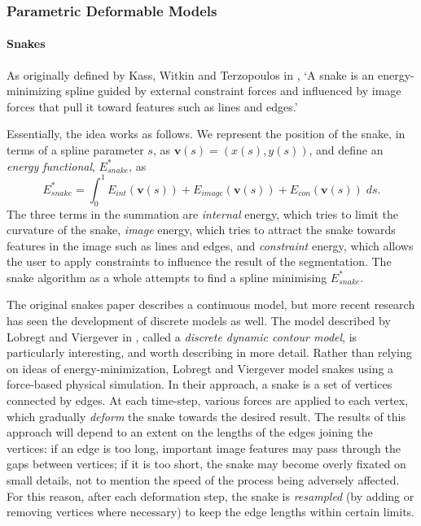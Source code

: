 \subsubsection{Parametric Deformable Models}

\paragraph{Snakes}

As originally defined by Kass, Witkin and Terzopoulos in \cite{kass88}, `A snake is an energy-minimizing spline guided by external constraint forces and influenced by image forces that pull it toward features such as lines and edges.'

Essentially, the idea works as follows. We represent the position of the snake, in terms of a spline parameter $s$, as $\mathbf{v}(s) = (x(s),y(s))$, and define an \emph{energy functional}, $E_{snake}^*$, as
%
\[
E_{snake}^* = \int_0^1 E_{int}(\mathbf{v}(s)) + E_{image}(\mathbf{v}(s)) + E_{con}(\mathbf{v}(s)) \; ds.
\]
%
The three terms in the summation are \emph{internal} energy, which tries to limit the curvature of the snake, \emph{image} energy, which tries to attract the snake towards features in the image such as lines and edges, and \emph{constraint} energy, which allows the user to apply constraints to influence the result of the segmentation. The snake algorithm as a whole attempts to find a spline minimising $E_{snake}^*$.

The original snakes paper describes a continuous model, but more recent research \cite{lobregt95,miller90b,miller90a} has seen the development of discrete models as well. The model described by Lobregt and Viergever in \cite{lobregt95}, called a \emph{discrete dynamic contour model}, is particularly interesting, and worth describing in more detail. Rather than relying on ideas of energy-minimization, Lobregt and Viergever model snakes using a force-based physical simulation. In their approach, a snake is a set of vertices connected by edges. At each time-step, various forces are applied to each vertex, which gradually \emph{deform} the snake towards the desired result. The results of this approach will depend to an extent on the lengths of the edges joining the vertices: if an edge is too long, important image features may pass through the gaps between vertices; if it is too short, the snake may become overly fixated on small details, not to mention the speed of the process being adversely affected. For this reason, after each deformation step, the snake is \emph{resampled} (by adding or removing vertices where necessary) to keep the edge lengths within certain limits.

